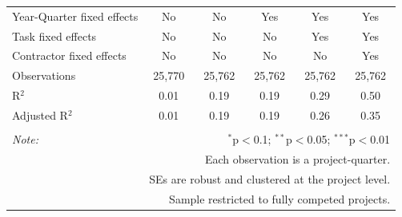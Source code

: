 \documentclass[
]{article}
\begin{document}
\begin{table}[H]
\begin{tabular}{@{\extracolsep{-2pt}}lccccc}
Year-Quarter fixed effects & No & No & Yes & Yes & Yes \\ 
Task fixed effects & No & No & No & Yes & Yes \\ 
Contractor fixed effects & No & No & No & No & Yes \\ 
Observations & 25,770 & 25,762 & 25,762 & 25,762 & 25,762 \\ 
R$^{2}$ & 0.01 & 0.19 & 0.19 & 0.29 & 0.50 \\ 
Adjusted R$^{2}$ & 0.01 & 0.19 & 0.19 & 0.26 & 0.35 \\ 
\hline 
\hline \\[-1.8ex] 
\textit{Note:}  & \multicolumn{5}{r}{$^{*}$p$<$0.1; $^{**}$p$<$0.05; $^{***}$p$<$0.01} \\ 
 & \multicolumn{5}{r}{Each observation is a project-quarter.} \\ 
 & \multicolumn{5}{r}{SEs are robust and clustered at the project level.} \\ 
 & \multicolumn{5}{r}{Sample restricted to fully competed projects.} \\ 
\end{tabular} 
\end{table}
\end{document}
